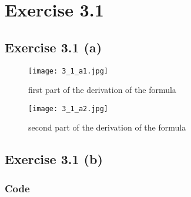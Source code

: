 \documentclass[12pt,a4paper]{article}	%
\newcommand{\x}{\textbf}
\begin{document}

\tableofcontents %
\thispagestyle{empty}
\newpage


\section{Exercise 3.1}
\subsection*{Exercise 3.1 (a)}

\begin{figure}[h!]		
\centering
{\texttt{[image: 3\_1\_a1.jpg]}}		
\caption{first part of the derivation of the formula}
\end{figure}

\newpage

\begin{figure}[h!]		
\centering
{\texttt{[image: 3\_1\_a2.jpg]}}		
\caption{second part of the derivation of the formula}
\end{figure}

\newpage



\subsection*{Exercise 3.1 (b)}
\subsubsection*{Code}

%
\newpage
\end{document}
